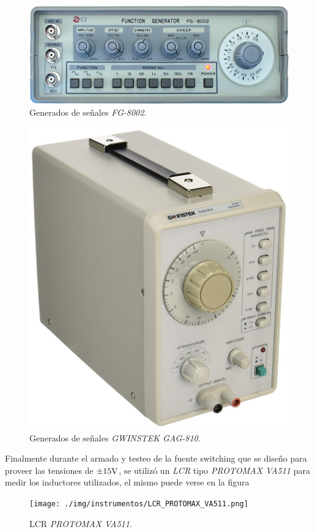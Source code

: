 \begin{figure}[H]
    \centering
    \includegraphics[width=0.5 \textwidth]{./img/instrumentos/FG_8002.png}
    \caption{Generados de señales \textit{FG-8002}.}
    \label{fig:signalgen1_lab}
\end{figure}

\vfill

\clearpage


\begin{figure}[H]
    \centering
    \includegraphics[width=0.5 \textwidth]{./img/instrumentos/GWINSTEK_GAG_810.png}
    \caption{Generados de señales \textit{GWINSTEK GAG-810}.}
    \label{fig:signalgen2_lab}
\end{figure}



Finalmente durante el armado y testeo de la fuente switching que se diseño para proveer las tensiones de $\pm 15 \si[per-mode=symbol]{\volt}$, se utilizó un \textit{LCR} tipo \textit{PROTOMAX VA511} para medir los inductores utilizados, el mismo puede verse en la figura~

\vfill

\clearpage


\begin{figure}[H]
    \centering
    \texttt{[image: ./img/instrumentos/LCR\_PROTOMAX\_VA511.png]}
    \caption{LCR \textit{PROTOMAX VA511}.}
    \label{fig:lcr_lab}
\end{figure}

\clearpage


